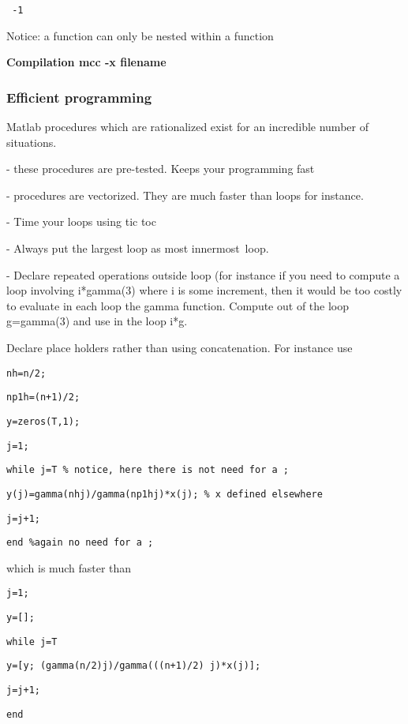 \documentclass[12pt,a4paper]{article}
\begin{document}
\texttt{\ -1}

\texttt{\bigskip }

Notice: a function can only be nested within a function

\textbf{Compilation mcc -x filename}

\subsubsection{Efficient programming}

Matlab procedures which are rationalized exist for an incredible number of
situations.

\qquad - these procedures are pre-tested. Keeps your programming fast

\qquad - procedures are vectorized. They are much faster than loops for
instance.

\qquad - Time your loops using tic toc

\qquad - Always put the largest loop as most innermost\ loop.

\qquad - Declare repeated operations outside loop (for instance if you need
to compute a loop involving i*gamma(3) where i is some increment, then it
would be too costly to evaluate in each loop the gamma function. Compute out
of the loop g=gamma(3) and use in the loop i*g.

Declare place holders rather than using concatenation. For instance use

\texttt{nh=n/2;}

\texttt{np1h=(n+1)/2;}

\texttt{y=zeros(T,1);}

\texttt{j=1;}

\texttt{while j\TEXTsymbol{<}=T \% notice, here there is not need for a ;}

\texttt{\qquad y(j)=gamma(nhj)/gamma(np1hj)*x(j); \% x
defined elsewhere }

\texttt{\qquad j=j+1;}

\texttt{end \%again no need for a ;}

which is much faster than

\texttt{j=1;}

\texttt{y=[];}

\texttt{while j\TEXTsymbol{<}=T}

\texttt{\qquad y=[y; (gamma(n/2)j)/gamma(((n+1)/2)%
j)*x(j)]; \qquad }

\texttt{\qquad j=j+1;}

\texttt{end}
\end{document}
